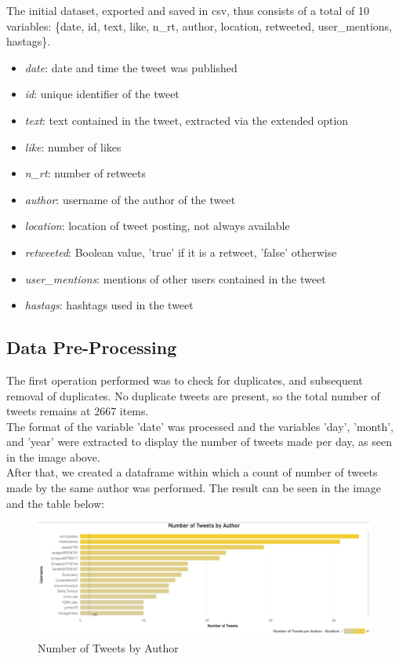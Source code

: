 \documentclass[12pt,journal,compsoc]{IEEEtran}
\begin{document}
The initial dataset, exported and saved in csv, thus consists of a total of 10 variables: \{date, id, text, like, n\_rt, author, location, retweeted, user\_mentions, hastags\}.

\begin{itemize}
	\item \textit{date}: date and time the tweet was published
	\item \textit{id}: unique identifier of the tweet
	\item \textit{text}: text contained in the tweet, extracted via the extended option
	\item \textit{like}: number of likes
	\item \textit{n\_rt}: number of retweets
	\item \textit{author}: username of the author of the tweet
	\item \textit{location}: location of tweet posting, not always available
	\item \textit{retweeted}: Boolean value, 'true' if it is a retweet, 'false' otherwise
	\item \textit{user\_mentions}: mentions of other users contained in the tweet
	\item \textit{hastags}: hashtags used in the tweet
\end{itemize}

\subsection{Data Pre-Processing}
The first operation performed was to check for duplicates, and subsequent removal of duplicates. No duplicate tweets are present, so the total number of tweets remains at 2667 items.\\
The format of the variable 'date' was processed and the variables 'day', 'month', and 'year' were extracted to display the number of tweets made per day, as seen in the image above.\\
After that, we created a dataframe within which a count of number of tweets made by the same author was performed. The result can be seen in the image and the table below:

\begin{figure}[H]
  \includegraphics[scale=0.4]{./images/tweetsxauthor.png}
  \caption{Number of Tweets by Author}
\end{figure}
\end{document}
